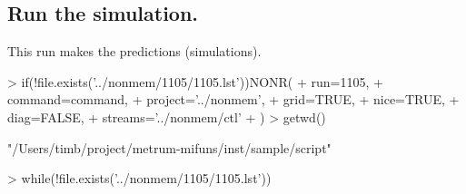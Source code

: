 \subsection{Run the simulation.}
This run makes the predictions (simulations).
\begin{Schunk}
\begin{Sinput}
> if(!file.exists('../nonmem/1105/1105.lst'))NONR(
+      run=1105,
+      command=command,
+      project='../nonmem',
+      grid=TRUE,
+      nice=TRUE,
+      diag=FALSE,
+      streams='../nonmem/ctl'
+ )
> getwd()
\end{Sinput}
\begin{Soutput}
[1] "/Users/timb/project/metrum-mifuns/inst/sample/script"
\end{Soutput}
\begin{Sinput}
> while(!file.exists('../nonmem/1105/1105.lst')){}
\end{Sinput}
\end{Schunk}
